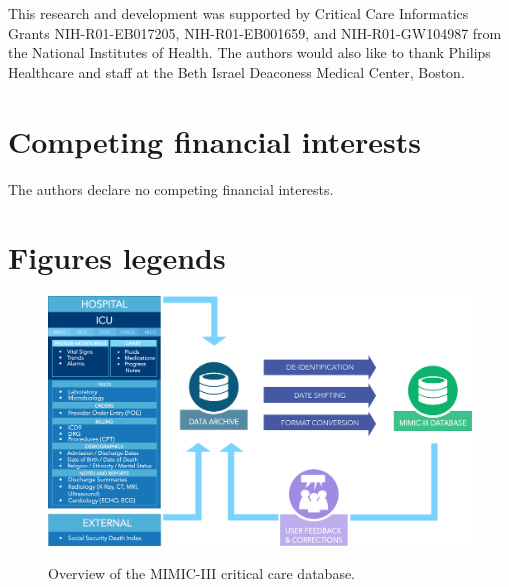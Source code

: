 \documentclass[english]{article}
\begin{document}
This research and development was supported by Critical Care Informatics Grants NIH-R01-EB017205, NIH-R01-EB001659, and NIH-R01-GW104987 from the National Institutes of Health. The authors would also like to thank Philips Healthcare and staff at the Beth Israel Deaconess Medical Center, Boston.

\section*{Competing financial interests}

The authors declare no competing financial interests.

\section*{Figures legends}



\begin{center}
\begin{figure}
\caption{Overview of the MIMIC-III critical care database.}
\includegraphics[width=\textwidth]{mimic.png}
\label{fig:mimicoverview}
\end{figure}
\end{center}
\end{document}
